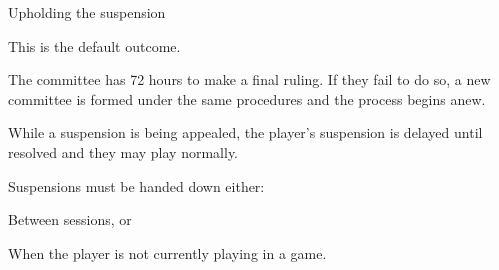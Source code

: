\begin{deepEnumerate}
\begin{deepEnumerate}
\begin{deepEnumerate}
\begin{deepEnumerate}
			\end{deepEnumerate}
			\item Upholding the suspension
			\begin{deepEnumerate}
				\item This is the default outcome.
			\end{deepEnumerate}
		\end{deepEnumerate}
		\item The committee has 72 hours to make a final ruling. If they fail to do so, a new committee is formed under the same procedures and the process begins anew.
		\item While a suspension is being appealed,	the player's suspension is delayed until resolved and they may play normally.
	\end{deepEnumerate}
	\item Suspensions must be handed down either:
	\begin{deepEnumerate}
		\item Between sessions, or
		\item When the player is not currently playing in a game.
	\end{deepEnumerate}
\end{deepEnumerate}

